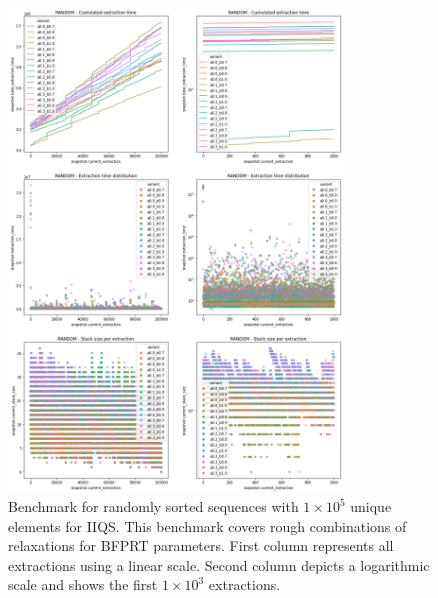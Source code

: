 \begin{figure}[!ht]
    \centering
    \includegraphics[width=0.79\textwidth]{./fragments/04_experimental_execution/images/04_alphabeta_detail_random.png}
    \caption{Benchmark for randomly sorted sequences with $1\times10^5$ unique elements for IIQS. This benchmark covers rough combinations of relaxations for BFPRT parameters. First column represents all extractions using a linear scale. Second column depicts a logarithmic scale and shows the first $1\times10^3$ extractions. }
    \label{FIG:05_ALPHABETA_BENCHMARK_RANDOM}
\end{figure}

